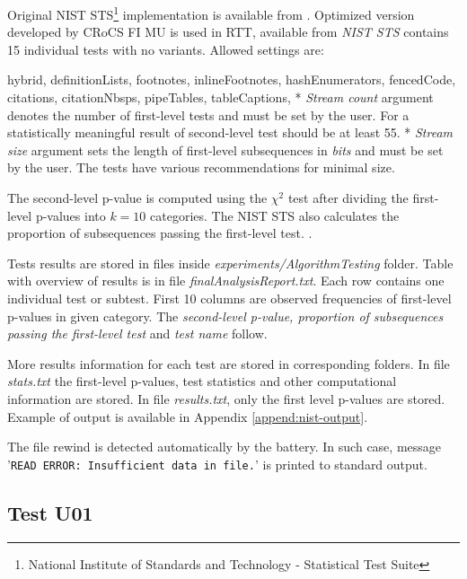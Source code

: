 \documentclass[
  digital,     %
  oneside,     %
  nosansbold,  %
  nocolorbold, %
  nolof,         %
  nolot,         %
]{fithesis4}
\begin{document}
Original NIST STS\footnote{National Institute of Standards and Technology - Statistical Test Suite} implementation is available from \cite{nist_site}. Optimized version developed by CRoCS FI MU \cite{nist_special} is used in RTT, available from \cite{rtt-batteries} \emph{NIST STS} contains 15 individual tests with no variants. Allowed settings are:
\begin{markdown*}{%
  hybrid,
  definitionLists,
  footnotes,
  inlineFootnotes,
  hashEnumerators,
  fencedCode,
  citations,
  citationNbsps,
  pipeTables,
  tableCaptions,
}
* \emph{Stream count} argument denotes the number of first-level tests and must be set by the user. For a statistically meaningful result of second-level test should be at least 55. 
* \emph{Stream size} argument sets the length of first-level subsequences in \emph{bits} and must be set by the user. The tests have various recommendations for minimal size.
\end{markdown*}

The second-level p-value is computed using the $\chi^2$ test after dividing the first-level p-values into $k=10$ categories. The NIST STS also calculates the proportion of subsequences passing the first-level test. \cite[p. 4-1]{nist_special}.

Tests results are stored in files inside \emph{experiments/AlgorithmTesting} folder. Table with overview of results is in file \emph{finalAnalysisReport.txt}. Each row contains one individual test or subtest. First 10 columns are observed frequencies of first-level p-values in given category. The \emph{second-level p-value, proportion of subsequences passing the first-level test} and \emph{test name} follow. 

More results information for each test are stored in corresponding folders. In file \emph{stats.txt} the first-level p-values, test statistics and other computational information are stored. In file \emph{results.txt}, only the first level p-values are stored. Example of output is available in Appendix \ref{append:nist-output}.

The file rewind is detected automatically by the battery. In such case, message '\texttt{READ ERROR:  Insufficient data in file.}' is printed to standard output.


\subsection{Test U01} \label{chap:sols-testu01}
\end{document}
